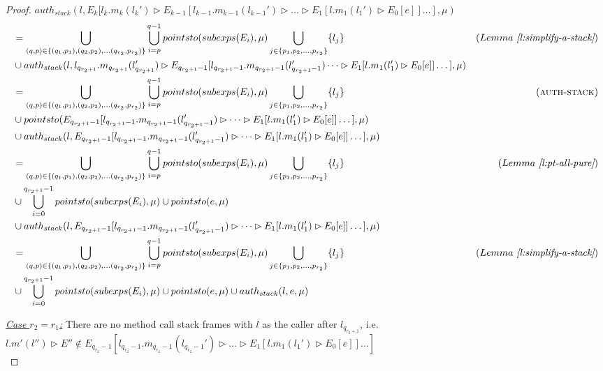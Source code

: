 \documentclass{llncs}
\begin{document}
\begin{proof}
\noindent$auth_{stack}(l, E_k[l_k.m_k(l_k') \rhd E_{k-1}[l_{k-1}.m_{k-1}(l_{k-1}') \rhd \dots \rhd E_1[l.m_1(l_1') \rhd E_0[e]] \dots ], \mu)$
\vspace{-7pt}
\begin{align*}
&=  \bigcup_{(q, p) \in \{ (q_1, p_1), (q_2, p_2), \dots (q_{r_2}, p_{r_2}) \}} \bigcup^{q-1}_{i = p} pointsto(subexps(E_i), \mu) \bigcup_{j \in \{ p_1, p_2, \dots, p_{r_2} \}} \{ l_j \} & (Lemma~\textit{\ref{l:simplify-a-stack}})\\
&\cup auth_{stack}(l, l_{q_{r_2+1}}.m_{q_{r_2+1}}(l_{q_{r_2+1}}') \rhd E_{q_{r_2+1}-1}[l_{q_{r_2+1}-1}.m_{q_{r_2+1}-1}(l_{q_{r_2+1}-1}')  \dots \rhd E_1[l.m_1(l_1') \rhd E_0[e]] \dots ], \mu)\\
&=  \bigcup_{(q, p) \in \{ (q_1, p_1), (q_2, p_2), \dots (q_{r_2}, p_{r_2}) \}} \bigcup^{q-1}_{i = p} pointsto(subexps(E_i), \mu) \bigcup_{j \in \{ p_1, p_2, \dots, p_{r_2} \}} \{ l_j \} & (\textsc{auth-stack})\\
&\cup pointsto(E_{q_{r_2+1}-1}[l_{q_{r_2+1}-1}.m_{q_{r_2+1}-1}(l_{q_{r_2+1}-1}') \rhd \dots \rhd E_1[l.m_1(l_1') \rhd E_0[e]] \dots ], \mu)\\
&\cup auth_{stack}(l, E_{q_{r_2+1}-1}[l_{q_{r_2+1}-1}.m_{q_{r_2+1}-1}(l_{q_{r_2+1}-1}') \rhd \dots \rhd E_1[l.m_1(l_1') \rhd E_0[e]] \dots ], \mu)\\
&=  \bigcup_{(q, p) \in \{ (q_1, p_1), (q_2, p_2), \dots (q_{r_2}, p_{r_2}) \}} \bigcup^{q-1}_{i = p} pointsto(subexps(E_i), \mu) \bigcup_{j \in \{ p_1, p_2, \dots, p_{r_2} \}} \{ l_j \} & (Lemma~\textit{\ref{l:pt-all-pure}})\\
&\cup \bigcup^{q_{r_2+1}-1}_{i = 0} pointsto(subexps(E_i), \mu) \cup pointsto(e, \mu)\\
&\cup auth_{stack}(l, E_{q_{r_2+1}-1}[l_{q_{r_2+1}-1}.m_{q_{r_2+1}-1}(l_{q_{r_2+1}-1}') \rhd \dots \rhd E_1[l.m_1(l_1') \rhd E_0[e]] \dots ], \mu)\\
&=  \bigcup_{(q, p) \in \{ (q_1, p_1), (q_2, p_2), \dots (q_{r_2}, p_{r_2}) \}} \bigcup^{q-1}_{i = p} pointsto(subexps(E_i), \mu) \bigcup_{j \in \{ p_1, p_2, \dots, p_{r_2} \}} \{ l_j \} & (Lemma~\textit{\ref{l:simplify-a-stack}})\\
&\cup \bigcup^{q_{r_2+1}-1}_{i = 0} pointsto(subexps(E_i), \mu) \cup pointsto(e, \mu) \cup auth_{stack}(l, e, \mu)
\end{align*}

\noindent\underline{\textit{Case $r_2 = r_1$:}} There are no method call stack frames with $l$ as the caller after $l_{q_{r_2+1}}$, i.e.\\
$l.m'(l'') \rhd E'' \not\in E_{q_{r_2}-1}[l_{q_{r_2}-1}.m_{q_{r_2}-1}(l_{q_{r_2}-1}') \rhd \dots \rhd E_1[l.m_1(l_1') \rhd E_0[e]] \dots ]$\\


\end{proof}
\end{document}
